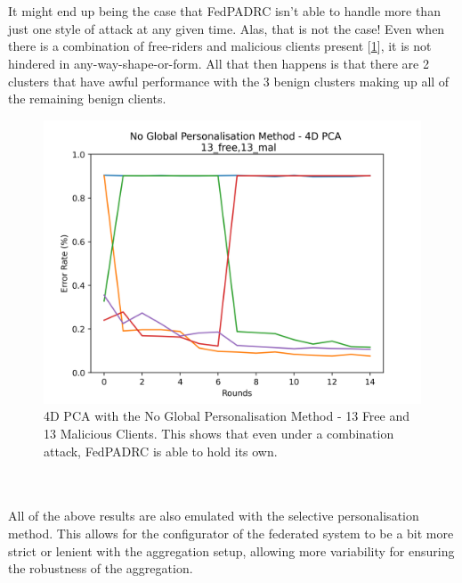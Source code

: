 \\ \\
It might end up being the case that FedPADRC isn't able to handle more than just one style of attack at any given time.
Alas, that is not the case!
Even when there is a combination of free-riders and malicious clients present [\ref{fig:no_13free_13mal}], it is not hindered in any-way-shape-or-form.
All that then happens is that there are 2 clusters that have awful performance with the 3 benign clusters making up all of the remaining benign clients.
\begin{figure}[htbp]
	\centering
    \includegraphics[scale=0.5]{my_agg/graphs/no_global_13free_13mal.png}
    \caption{4D PCA with the No Global Personalisation Method - 13 Free and 13 Malicious Clients. This shows that even under a combination attack, FedPADRC is able to hold its own.}
	\label{fig:no_13free_13mal}
\end{figure}
\\ \\
All of the above results are also emulated with the selective personalisation method.
This allows for the configurator of the federated system to be a bit more strict or lenient with the aggregation setup, allowing more variability for ensuring the robustness of the aggregation.

